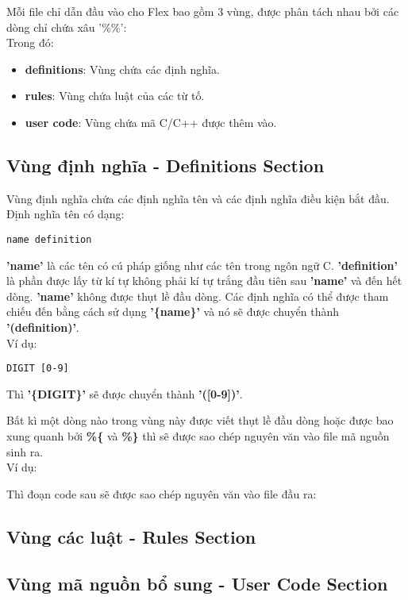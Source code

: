 \documentclass[../report.tex]{subfiles}
\begin{document}
Mỗi file chỉ dẫn đầu vào cho Flex bao gồm 3 vùng, được phân tách nhau 
bởi các dòng chỉ chứa xâu '\%\%': \\


\noindent Trong đó: 
\begin{itemize}
\item \textbf{definitions}: Vùng chứa các định nghĩa. 
\item \textbf{rules}: Vùng chứa luật của các từ tố. 
\item \textbf{user code}: Vùng chứa mã C/C++ được thêm vào.
\end{itemize}

\subsection{Vùng định nghĩa - Definitions Section}
Vùng định nghĩa chứa các định nghĩa tên và các định nghĩa điều kiện bắt đầu.
Định nghĩa tên có dạng:
\begin{lstlisting}
name definition
\end{lstlisting}
\textbf{'name'} là các tên có cú pháp giống như các tên trong ngôn ngữ C.
\textbf{'definition'} là phần được lấy từ kí tự không phải kí tự trắng đầu tiên 
sau \textbf{'name'} và đến hết dòng. 
\textbf{'name'} không được thụt lề đầu dòng. 
Các định nghĩa có thể được tham chiếu đến bằng cách sử dụng \textbf{'\{name\}'} 
và nó sẽ được chuyển thành \textbf{'(definition)'}. \\
Ví dụ: 
\begin{lstlisting}
DIGIT [0-9]
\end{lstlisting}
Thì \textbf{'\{DIGIT\}'} sẽ được chuyển thành \textbf{'([0-9])'}.

Bất kì một dòng nào trong vùng này được viết thụt lề đầu dòng hoặc 
được bao xung quanh bởi \textbf{\%\{} và \textbf{\%\}} thì sẽ được sao chép nguyên văn 
vào file mã nguồn sinh ra. \\
Ví dụ: 

Thì đoạn code sau sẽ được sao chép nguyên văn vào file đầu ra: 


\subsection{Vùng các luật - Rules Section}
\subsection{Vùng mã nguồn bổ sung - User Code Section}
\end{document}
